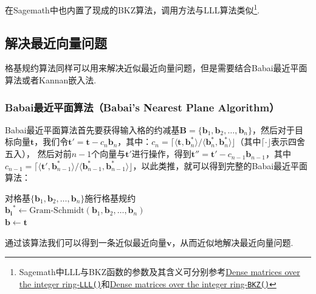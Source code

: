 \documentclass{book}
\numberwithin{equation}{subsubsection}
\begin{document}
在Sagemath中也内置了现成的BKZ算法，调用方法与LLL算法类似\footnote{Sagemath中LLL与BKZ函数的参数及其含义可分别参考\href{https://doc.sagemath.org/html/en/reference/matrices/sage/matrix/matrix\_integer\_dense.html\#sage.matrix.matrix\_integer\_dense.Matrix\_integer\_dense.LLL}{Dense matrices over the integer ring-\texttt{LLL()}}和\href{https://doc.sagemath.org/html/en/reference/matrices/sage/matrix/matrix\_integer\_dense.html\#sage.matrix.matrix\_integer\_dense.Matrix\_integer\_dense.BKZ}{Dense matrices over the integer ring-\texttt{BKZ()}}}.

\subsection{解决最近向量问题}
格基规约算法同样可以用来解决近似最近向量问题，但是需要结合Babai最近平面算法或者Kannan嵌入法.
\subsubsection*{Babai最近平面算法（Babai’s Nearest Plane Algorithm）}
Babai最近平面算法首先要获得输入格的约减基$\pmb{B}=\{\pmb{b}_1,\pmb{b}_2,\ldots,\pmb{b}_n\}$，然后对于目标向量$\pmb{t}$，我们令$\pmb{t}'=\pmb{t}-c_n\pmb{b}_n$，其中：$c_n=\lceil\langle\pmb{t},\pmb{b}^*_{n}\rangle/\langle\pmb{b}^*_{n},\pmb{b}^*_{n}\rangle\rfloor$（其中$\lceil\cdot\rfloor$表示四舍五入），
然后对前$n-1$个向量与$\pmb{t}'$进行操作，得到$\pmb{t}''=\pmb{t}'-c_{n-1}\pmb{b}_{n-1}$，其中$c_{n-1}=\lceil\langle\pmb{t}',\pmb{b}^*_{n-1}\rangle/\langle\pmb{b}^*_{n-1},\pmb{b}^*_{n-1}\rangle\rfloor$，以此类推，就可以得到完整的Babai最近平面算法\cite{14}：

\begin{algorithm}[h!]
    \caption{$\text{Babai}(\{\pmb{b}_1,\pmb{b}_2,\ldots,\pmb{b}_n\},\pmb{t})$}
    对格基$\{\pmb{b}_1,\pmb{b}_2,\ldots,\pmb{b}_n\}$施行格基规约\\
    $\pmb{b_i}^{*} \leftarrow \text{Gram-Schmidt}(\pmb{b}_1, \pmb{b}_2, \ldots, \pmb{b}_n)$\\
    $\pmb{b} \leftarrow \pmb{t}$\\
\end{algorithm}
通过该算法我们可以得到一条近似最近向量$\pmb{v}$，从而近似地解决最近向量问题.\par
\end{document}
